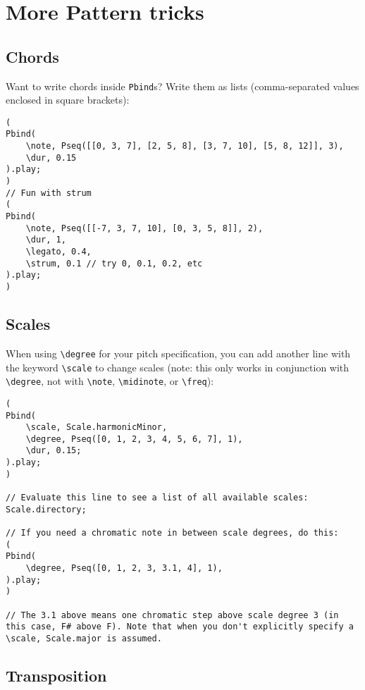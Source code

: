 \section{More Pattern tricks}

\subsection{Chords}

Want to write chords inside \texttt{Pbind}s? Write them as lists (comma-separated values enclosed in square brackets):
 
\begin{lstlisting}[style=SuperCollider-IDE, basicstyle=\scttfamily\footnotesize]
(
Pbind(
	\note, Pseq([[0, 3, 7], [2, 5, 8], [3, 7, 10], [5, 8, 12]], 3),
	\dur, 0.15
).play;
)
// Fun with strum
(
Pbind(
	\note, Pseq([[-7, 3, 7, 10], [0, 3, 5, 8]], 2),
	\dur, 1,
	\legato, 0.4,
	\strum, 0.1 // try 0, 0.1, 0.2, etc
).play;
)
\end{lstlisting}
 

\subsection{Scales}

When using \texttt{\textbackslash degree} for your pitch specification, you can add another line with the keyword \texttt{\textbackslash scale} to change scales (note: this only works in conjunction with \texttt{\textbackslash degree}, not with \texttt{\textbackslash note}, \texttt{\textbackslash midinote}, or \texttt{\textbackslash freq}):

 
\begin{lstlisting}[style=SuperCollider-IDE, basicstyle=\scttfamily\footnotesize]
(
Pbind(
	\scale, Scale.harmonicMinor,
	\degree, Pseq([0, 1, 2, 3, 4, 5, 6, 7], 1),
	\dur, 0.15;
).play;
)

// Evaluate this line to see a list of all available scales:
Scale.directory;

// If you need a chromatic note in between scale degrees, do this:
(
Pbind(
	\degree, Pseq([0, 1, 2, 3, 3.1, 4], 1),
).play;
)

// The 3.1 above means one chromatic step above scale degree 3 (in this case, F# above F). Note that when you don't explicitly specify a \scale, Scale.major is assumed.
\end{lstlisting}

\subsection{Transposition}

